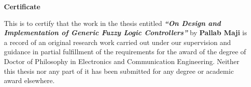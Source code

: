 \centerline{\Large{\bf Certificate}}
\vspace{1cm}
\noindent
This is to certify that the work in the thesis entitled {\bf \emph{``On Design and Implementation of Generic Fuzzy Logic Controllers''}} by {\bf {Pallab Maji}} is a record of an original research work carried out under our supervision and guidance in partial fulfillment of the requirements for the award of the degree of Doctor of Philosophy in Electronics and Communication Engineering. Neither this thesis nor any part of it has been submitted for any degree or academic award elsewhere.\\
%
\vskip 2cm
%
\vspace{1cm}

